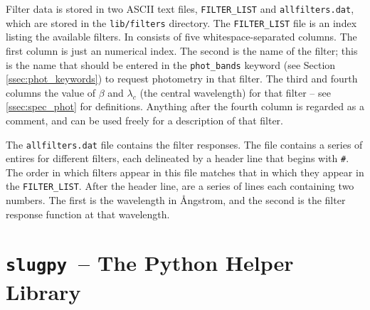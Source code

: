 \documentclass[12pt]{article}
\newcommand{\slugpy}{\texttt{slugpy}}
\begin{document}
Filter data is stored in two ASCII text files, \verb=FILTER_LIST= and \verb=allfilters.dat=, which are stored in the \verb=lib/filters= directory. The \verb=FILTER_LIST= file is an index listing the available filters. In consists of five whitespace-separated columns. The first column is just an numerical index. The second is the name of the filter; this is the name that should be entered in the \verb=phot_bands= keyword (see Section \ref{ssec:phot_keywords}) to request photometry in that filter. The third and fourth columns the value of $\beta$ and $\lambda_c$ (the central wavelength) for that filter -- see \ref{ssec:spec_phot} for definitions. Anything after the fourth column is regarded as a comment, and can be used freely for a description of that filter.

The \verb=allfilters.dat= file contains the filter responses. The file contains a series of entires for different filters, each delineated by a header line that begins with \verb=#=. The order in which filters appear in this file matches that in which they appear in the \verb=FILTER_LIST=. After the header line, are a series of lines each containing two numbers. The first is the wavelength in {\AA}ngstrom, and the second is the filter response function at that wavelength.

\section{\slugpy\ -- The Python Helper Library}
\end{document}
